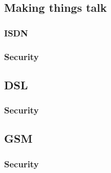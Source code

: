 \subsection{Making things talk}

\subsubsection{ISDN}
\subsubsection{Security}

\subsection{DSL}
\subsubsection{Security}

\subsection{GSM}
\subsubsection{Security}

